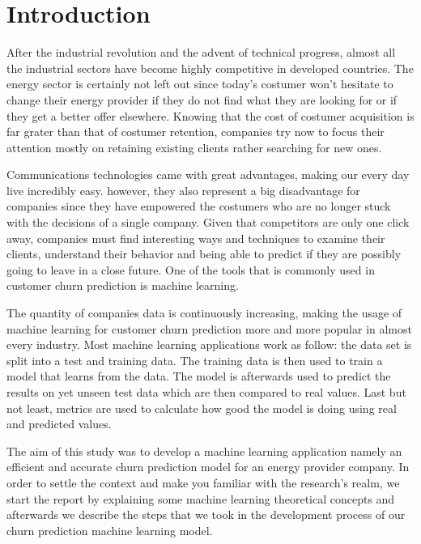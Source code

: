 \documentclass[LaM,binding=0.6cm, english]{sapthesis}
\begin{document}
\tableofcontents

\printnoidxglossaries

\listoffigures

\listoftables

\mainmatter

\chapter{Introduction}

\par After the industrial revolution and the advent of technical progress, almost all the industrial sectors have become highly competitive in developed countries. The energy sector is certainly not left out since today's costumer won't hesitate to change their energy provider if they do not find what they are looking for or if they get a better offer elsewhere. Knowing that the cost of costumer acquisition is far grater than that of costumer retention, companies try now to focus their attention mostly on retaining existing clients rather searching for new ones.

\par Communications technologies came with great advantages, making our every day live incredibly easy. however, they also represent a big disadvantage for companies since they have empowered the costumers who are no longer stuck with the decisions of a single company. Given that competitors are only one click away, companies must find interesting ways and techniques to examine their clients, understand their behavior and being able to predict if they are possibly going to leave in a close future. One of the tools that is commonly used in customer churn prediction is machine learning.

\par The quantity of companies data is continuously increasing, making the usage of machine learning for customer churn prediction more and more popular in almost every industry. Most machine learning applications work as follow: the data set is split into a test and training data. The training data is then used to train a model that learns from the data. The model is afterwards used to predict the results on yet unseen test data which are then compared to real values. Last but not least, metrics are used to calculate how good the model is doing using real and predicted values.\cite{Geron2017}

\par The aim of this study was to develop a machine learning application namely an efficient and accurate churn prediction model for an energy provider company. In order to settle the context and make you familiar with the research's realm, we start the report by explaining some machine learning theoretical concepts and afterwards we describe the steps that we took in the development process of our churn prediction machine learning model.
\end{document}
